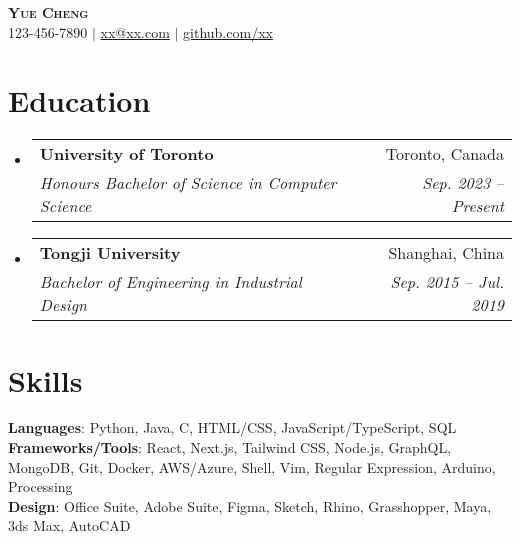 \documentclass[letterpaper,11pt]{article}
\makeatletter
\newcommand{\resumeSubheading}[4]{
  \item
    \begin{tabular*}{0.98\textwidth}[t]{l@{\extracolsep{\fill}}r}
      \textbf{#1} & {#2} \\
      \textit{\small{#3}} & \textit{\small{#4}}
    \end{tabular*}
    \vspace{-12pt}
}
\newcommand{\resumeSubHeadingListStart}{\begin{itemize}[leftmargin=0.15in, label={}]}
\newcommand{\resumeSubHeadingListEnd}{\end{itemize}}
\makeatother
\begin{document}
\begin{center}
  \textbf{\Large \textsc{Yue Cheng}} \\ \vspace{4pt}
  \small 123-456-7890 $|$
  \href{mailto:xx@xx.com}{xx@xx.com} $|$
  \href{https://github.com/xx}{github.com/xx}
\end{center}

\section{Education}
\resumeSubHeadingListStart
\resumeSubheading
{University of Toronto}{Toronto, Canada}
{Honours Bachelor of Science in Computer Science}{Sep. 2023 -- Present}
\resumeSubheading
{Tongji University}{Shanghai, China}
{Bachelor of Engineering in Industrial Design}{Sep. 2015 -- Jul. 2019}
\resumeSubHeadingListEnd

\vspace{6pt}

\section{Skills}
\resumeSubHeadingListStart
\small{\item{
              \textbf{Languages}{: Python, Java, C, HTML/CSS, JavaScript/TypeScript, SQL} \\
              \textbf{Frameworks/Tools}{: React, Next.js, Tailwind CSS, Node.js, GraphQL, MongoDB, Git, Docker, AWS/Azure, Shell, Vim, Regular Expression, Arduino, Processing} \\
              \textbf{Design}{: Office Suite, Adobe Suite, Figma, Sketch, Rhino, Grasshopper, Maya, 3ds Max, AutoCAD} \\
        }}
\resumeSubHeadingListEnd

\end{document}
